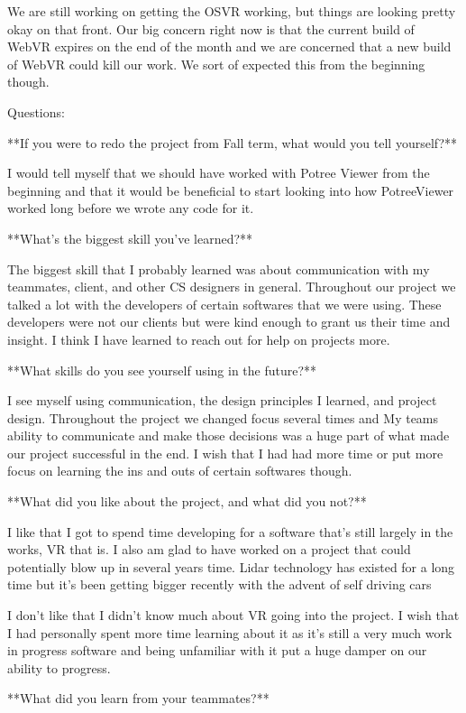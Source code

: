 \documentclass[draftclsnofoot,onecolumn]{IEEEtran}
\begin{document}
We are still working on getting the OSVR working, but things are looking pretty okay on that front. Our big concern right now is that the current build of WebVR expires on the end of the month and we are concerned that a new build of WebVR could kill our work. We sort of expected this from the beginning though.

Questions:

**If you were to redo the project from Fall term, what would you tell yourself?**

I would tell myself that we should have worked with Potree Viewer from the beginning and that it would be beneficial to start looking into how PotreeViewer worked long before we wrote any code for it.

**What's the biggest skill you've learned?**

The biggest skill that I probably learned was about communication with my teammates, client, and other CS designers in general. Throughout our project we talked a lot with the developers of certain softwares that we were using. These developers were not our clients but were kind enough to grant us their time and insight. I think I have learned to reach out for help on projects more.

**What skills do you see yourself using in the future?**

I see myself using communication, the design principles I learned, and project design. Throughout the project we changed focus several times and My teams ability to communicate and make those decisions was a huge part of what made our project successful in the end. I wish that I had had more time or put more focus on learning the ins and outs of certain softwares though.

**What did you like about the project, and what did you not?**

I like that I got to spend time developing for a software that's still largely in the works, VR that is. I also am glad to have worked on a project that could potentially blow up in several years time. Lidar technology has existed for a long time but it's been getting bigger recently with the advent of self driving cars 

I don't like that I didn't know much about VR going into the project. I wish that I had personally spent more time learning about it as it's still a very much work in progress software and being unfamiliar with it put a huge damper on our ability to progress.

**What did you learn from your teammates?**
\end{document}
